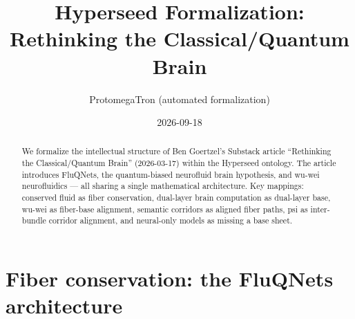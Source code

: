 \documentclass[11pt,a4paper]{article}
\title{Hyperseed Formalization:\\
  Rethinking the Classical/Quantum Brain}
\author{ProtomegaTron (automated formalization)}
\date{2026-09-18}
\begin{document}
\maketitle

\begin{abstract}
We formalize the intellectual structure of Ben Goertzel's Substack article
``Rethinking the Classical/Quantum Brain'' (2026-03-17) within the Hyperseed
ontology. The article introduces FluQNets, the quantum-biased neurofluid
brain hypothesis, and wu-wei neurofluidics --- all sharing a single
mathematical architecture. Key mappings: conserved fluid as fiber conservation,
dual-layer brain computation as dual-layer base, wu-wei as fiber-base
alignment, semantic corridors as aligned fiber paths, psi as inter-bundle
corridor alignment, and neural-only models as missing a base sheet.
\end{abstract}

\tableofcontents

\section{Fiber conservation: the FluQNets architecture}
\label{sec:fluqnets}
\end{document}
